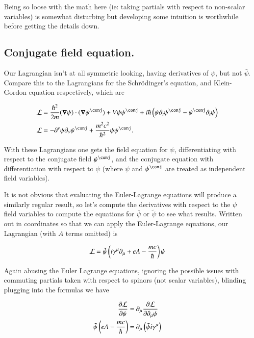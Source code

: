 Being so loose with the math here (ie: taking partials with respect to non-scalar variables) is somewhat disturbing but developing some intuition is worthwhile before getting the details down.

\subsection{Conjugate field equation. }

Our Lagrangian isn't at all symmetric looking, having derivatives of $\psi$, but not $\bar\psi$.  Compare this to the Lagrangians for the 
Schr\"{o}dinger's equation, and Klein-Gordon equation respectively, which are

\begin{align}
\LL &= \frac{\hbar^2}{2m}
(\spacegrad \psi) \cdot (\spacegrad \psi^\conj) + V \psi \psi^\conj + {i \hbar} \left( \psi \partial_t \psi^\conj - \psi^\conj \partial_t \psi \right) \\
\LL &= -\partial^\nu \psi \partial_\nu \psi^\conj + \frac{m^2 c^2}{\hbar^2} \psi \psi^\conj.
\end{align}

With these Lagrangians one gets the field equation for $\psi$, differentiating with respect to the conjugate field $\psi^\conj$, and the conjugate equation with differentiation with respect to $\psi$ (where $\psi$ and $\psi^\conj$ are treated as independent field variables).

It is not obvious that evaluating the Euler-Lagrange equations will produce a similarly regular result, so
let's compute the derivatives with respect to the $\psi$ field variables to compute the equations for $\bar \psi$ or $\tilde{\psi}$ to see what results.  Written out in coordinates so that we can apply the Euler-Lagrange equations, our Lagrangian (with $A$ terms omitted) is

\begin{align}\label{eqn:diracLag:lag4}
\mathcal{L} = \tilde{\psi}\left( i \gamma^\mu \partial_\mu + e A - \frac{m c}{\hbar} \right) \psi
\end{align}

Again abusing the Euler Lagrange equations, ignoring the possible issues with commuting partials taken
with respect to spinors (not scalar variables), blinding plugging into the formulas we have

\begin{align*}
\frac{\partial {\mathcal{L}}}{\partial {\psi}} &= \partial_\mu \frac{\partial {\mathcal{L}}}{\partial {\partial_\mu \psi}} \\
\tilde{\psi}\left( e A - \frac{m c}{\hbar} \right) &= \partial_\mu \left(\tilde{\psi} i \gamma^\mu \right)
\end{align*}

